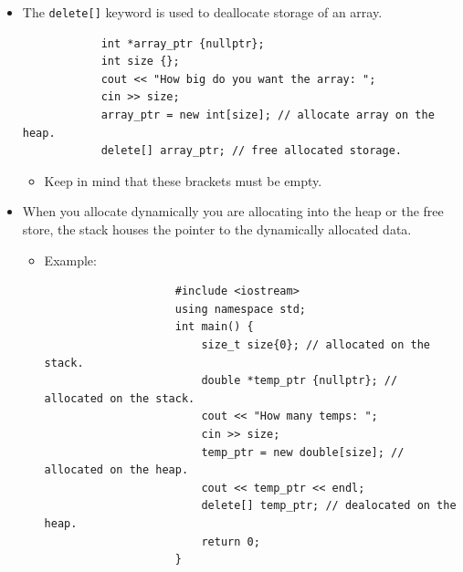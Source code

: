 \begin{itemize}
    \item The \texttt{delete[]} keyword is used to deallocate storage of an array.
        \begin{verbatim}
            int *array_ptr {nullptr};
            int size {};
            cout << "How big do you want the array: ";
            cin >> size;
            array_ptr = new int[size]; // allocate array on the heap.
            delete[] array_ptr; // free allocated storage.
        \end{verbatim}
        \begin{itemize}
            \item Keep in mind that these brackets must be empty.
        \end{itemize}
    
    \item When you allocate dynamically you are allocating into the heap or the free store, the stack houses the pointer to the dynamically allocated data.
        \begin{itemize}
            \item Example:
                \begin{verbatim}
                    #include <iostream>
                    using namespace std;
                    int main() {
                        size_t size{0}; // allocated on the stack.
                        double *temp_ptr {nullptr}; // allocated on the stack.
                        cout << "How many temps: "; 
                        cin >> size;
                        temp_ptr = new double[size]; // allocated on the heap.
                        cout << temp_ptr << endl;
                        delete[] temp_ptr; // dealocated on the heap.
                        return 0;
                    }
                \end{verbatim}
        \end{itemize}
\end{itemize}



